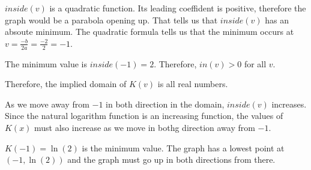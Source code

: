 \documentclass{ximera}
\begin{document}
$inside(v)$ is a quadratic function.  Its leading coeffident is positive, therefore the graph would be a parabola opening up.  That tells us that $inside(v)$ has an absoute minimum.  The quadratic formula tells us that the minimum occurs at $v=\frac{-b}{2a} = \frac{-2}{2} = -1$.

The minimum value is $inside(-1) = 2$.  Therefore, $in(v) > 0$ for all $v$.

Therefore, the implied domain of $K(v)$ is all real numbers.


As we move away from $-1$ in both direction in the domain, $inside(v)$ increases. Since the natural logarithm function is an increasing function, the values of $K(x)$ must also increase as we move in bothg direction away from $-1$.


$K(-1) = \ln(2)$ is the minimum value.  The graph has a lowest point at $(-1, \ln(2))$ and the graph must go up in both directions from there.








\begin{image}
\end{image}
\end{document}
